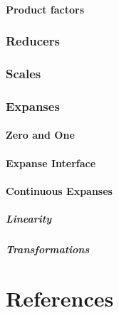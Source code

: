 \documentclass[
]{book}
\theoremstyle{definition}
\theoremstyle{definition}
\theoremstyle{definition}
\theoremstyle{definition}
\theoremstyle{remark}
\begin{document}
\hypertarget{product-factors}{%
\subsubsection{Product factors}\label{product-factors}}

\hypertarget{reducers}{%
\subsection{Reducers}\label{reducers}}

\hypertarget{scales-1}{%
\subsection{Scales}\label{scales-1}}

\hypertarget{expanses}{%
\subsection{Expanses}\label{expanses}}

\hypertarget{zero-and-one}{%
\subsubsection{Zero and One}\label{zero-and-one}}

\hypertarget{expanse-interface}{%
\subsubsection{Expanse Interface}\label{expanse-interface}}

\hypertarget{continuous-expanses}{%
\subsubsection{Continuous Expanses}\label{continuous-expanses}}

\hypertarget{linearity}{%
\paragraph{Linearity}\label{linearity}}

\hypertarget{transformations}{%
\paragraph{Transformations}\label{transformations}}

\hypertarget{references}{%
\chapter{References}\label{references}}
\end{document}

